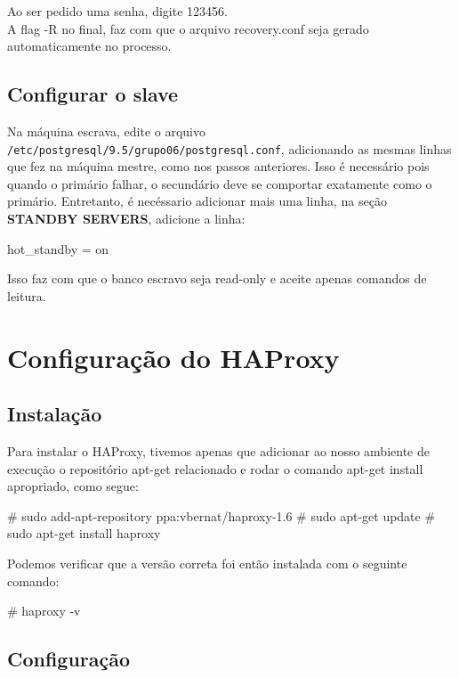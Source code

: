 \documentclass[a4paper,10pt]{article}
\begin{document}
        Ao ser pedido uma senha, digite 123456.\\
        A flag -R no final, faz com que o arquivo recovery.conf seja gerado automaticamente no processo.

    \subsection{Configurar o slave}
        Na máquina escrava, edite o arquivo \verb|/etc/postgresql/9.5/grupo06/postgresql.conf|, adicionando as mesmas linhas que fez na máquina mestre, como nos passos anteriores. Isso é necessário pois quando o primário falhar, o secundário deve se comportar exatamente como o primário. Entretanto, é necéssario adicionar mais uma linha, na seção \textbf{STANDBY SERVERS}, adicione a linha:
        \begin{spverbatim}
        hot_standby = on
        \end{spverbatim}

        Isso faz com que o banco escravo seja read-only e aceite apenas comandos de leitura.

\section{Configuração do HAProxy}

    \subsection{Instalação}

        Para instalar o HAProxy, tivemos apenas que adicionar ao nosso ambiente de execução o repositório apt-get relacionado e rodar o comando apt-get install apropriado, como segue:

        \begin{spverbatim}
        # sudo add-apt-repository ppa:vbernat/haproxy-1.6
        # sudo apt-get update
        # sudo apt-get install haproxy
        \end{spverbatim}

        Podemos verificar que a versão correta foi então instalada com o seguinte comando:

       \begin{spverbatim}
        # haproxy -v
        \end{spverbatim}

    \subsection{Configuração}
\end{document}
